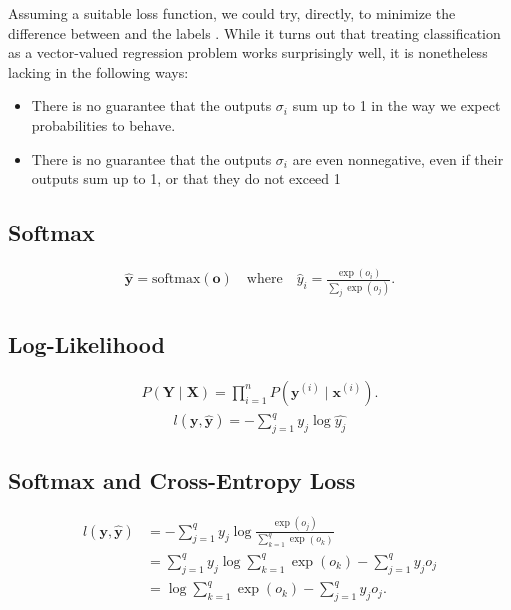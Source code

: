 \documentclass[a4paper,12pt]{article}
\theoremstyle{definition}
\begin{document}
Assuming a suitable loss function, we could try, directly, to minimize the difference between
and the labels
. While it turns out that treating classification as a vector-valued regression problem works surprisingly well, it is nonetheless lacking in the following ways:
\begin{itemize}
    \item There is no guarantee that the outputs $\sigma_i$ sum up to 1 in the way we expect probabilities to behave.
    \item There is no guarantee that the outputs $\sigma_i$ are even nonnegative, even if their outputs sum up to 1, or that they do not exceed 1
\end{itemize}
\subsection*{Softmax}
\begin{equation*}
    \begin{aligned}
        \hat{\mathbf{y}} = \mathrm{softmax}(\mathbf{o}) \quad \text{where} \quad \hat{y}_i = \frac{\exp(o_i)}{\sum_j \exp(o_j)}.
    \end{aligned}
\end{equation*}

\subsection*{Log-Likelihood}
\begin{equation*}
    \begin{aligned}
        P(\mathbf{Y} \mid \mathbf{X}) = \prod_{i=1}^n P(\mathbf{y}^{(i)} \mid \mathbf{x}^{(i)}).
    \end{aligned}
\end{equation*}
\begin{equation*}
    \begin{aligned}
        l(\mathbf{y},\mathbf{\hat{y}}) = -\sum_{j=1}^{q}y_j \log \hat{y_j}
    \end{aligned}
\end{equation*}

\subsection*{Softmax and Cross-Entropy Loss}
\begin{equation*}
    \begin{aligned}
        l(\mathbf{y}, \hat{\mathbf{y}}) & =  - \sum_{j=1}^q y_j \log \frac{\exp(o_j)}{\sum_{k=1}^q \exp(o_k)}   \\
                                        & = \sum_{j=1}^q y_j \log \sum_{k=1}^q \exp(o_k) - \sum_{j=1}^q y_j o_j \\
                                        & = \log \sum_{k=1}^q \exp(o_k) - \sum_{j=1}^q y_j o_j.
    \end{aligned}
\end{equation*}
\end{document}

